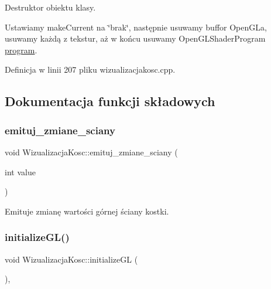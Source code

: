 Destruktor obiektu klasy. 

Ustawiamy make\+Current na \char`\"{}brak\char`\"{}, następnie usuwamy buffor Open\+GL\textquotesingle{}a, usuwamy każdą z tekstur, aż w końcu usuwamy Open\+G\+L\+Shader\+Program \hyperlink{}{program}. 

Definicja w linii 207 pliku wizualizacjakosc.\+cpp.



\subsection{Dokumentacja funkcji składowych}
\mbox{\label{class_wizualizacja_kosc_a75401957f09d9e9ce273cabfc262c52e}} 
\subsubsection{\texorpdfstring{emituj\+\_\+zmiane\+\_\+sciany}{emituj\_zmiane\_sciany}}
{\footnotesize\ttfamily void Wizualizacja\+Kosc\+::emituj\+\_\+zmiane\+\_\+sciany (\begin{DoxyParamCaption}\item[{int}]{value }\end{DoxyParamCaption})\hspace{0.3cm}{\ttfamily [signal]}}



Emituje zmianę wartości górnej ściany kostki. 

\mbox{\label{class_wizualizacja_kosc_aaaef65ae5a984bf54ebfa56069670c5f}} 
\subsubsection{\texorpdfstring{initialize\+G\+L()}{initializeGL()}}
{\footnotesize\ttfamily void Wizualizacja\+Kosc\+::initialize\+GL (\begin{DoxyParamCaption}{ }\end{DoxyParamCaption})\hspace{0.3cm}{\ttfamily [override]}, {\ttfamily [protected]}}



